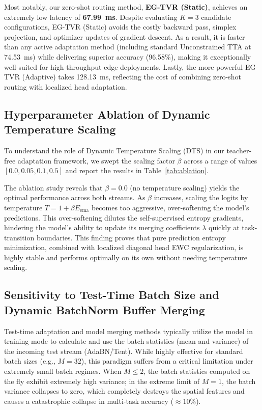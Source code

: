 \documentclass{article}
\theoremstyle{plain}
\theoremstyle{definition}
\theoremstyle{remark}
\begin{document}
Most notably, our zero-shot routing method, \textbf{EG-TVR (Static)}, achieves an extremely low latency of \textbf{67.99~ms}. Despite evaluating $K=3$ candidate configurations, EG-TVR (Static) avoids the costly backward pass, simplex projection, and optimizer updates of gradient descent. As a result, it is faster than any active adaptation method (including standard Unconstrained TTA at 74.53~ms) while delivering superior accuracy (96.58\%), making it exceptionally well-suited for high-throughput edge deployments. Lastly, the more powerful EG-TVR (Adaptive) takes 128.13~ms, reflecting the cost of combining zero-shot routing with localized head adaptation.

\subsection{Hyperparameter Ablation of Dynamic Temperature Scaling}
To understand the role of Dynamic Temperature Scaling (DTS) in our teacher-free adaptation framework, we swept the scaling factor $\beta$ across a range of values $[0.0, 0.05, 0.1, 0.5]$ and report the results in Table~\ref{tab:ablation}.

The ablation study reveals that $\beta=0.0$ (no temperature scaling) yields the optimal performance across both streams. As $\beta$ increases, scaling the logits by temperature $T = 1 + \beta E_{\text{ema}}$ becomes too aggressive, over-softening the model's predictions. This over-softening dilutes the self-supervised entropy gradients, hindering the model's ability to update its merging coefficients $\lambda$ quickly at task-transition boundaries. This finding proves that pure prediction entropy minimization, combined with localized diagonal head EWC regularization, is highly stable and performs optimally on its own without needing temperature scaling.

\subsection{Sensitivity to Test-Time Batch Size and Dynamic BatchNorm Buffer Merging}
Test-time adaptation and model merging methods typically utilize the model in training mode to calculate and use the batch statistics (mean and variance) of the incoming test stream (AdaBN/Tent). While highly effective for standard batch sizes (e.g., $M=32$), this paradigm suffers from a critical limitation under extremely small batch regimes. When $M \le 2$, the batch statistics computed on the fly exhibit extremely high variance; in the extreme limit of $M=1$, the batch variance collapses to zero, which completely destroys the spatial features and causes a catastrophic collapse in multi-task accuracy ($\approx 10\%$).
\end{document}
